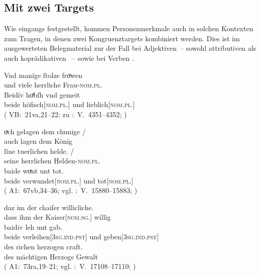 \subsection{Mit zwei Targets}
\label{subsec:beidkoordtarg}

Wie eingangs festgestellt, kommen Personenmerkmale auch in
solchen Kontexten zum Tragen, in denen zwei Kongruenztargets kombiniert werden.
Dies ist im ausgewerteten Belegmaterial zur \KC{} der Fall bei Adjektiven~--
sowohl attributiven  als auch
koprädikativen ~-- sowie bei
Verben .

\largerpage %
\begin{exe}
\ex \begin{xlist}
	\ex\label{ex:konjattradj}
		\gll Vnd maníge ſtolze froͮwen \\
			und viele herrliche Frau-\textsc{nom.pl.\FemF} \\%
	\sn \gll Beidív hoͤbſh vnd gemeit \\
			beide höfisch[\textsc{nom.pl.\FemF}] und lieblich[\textsc{nom.pl.\FemF}] \\
		\trans {} (%
				VB:~21va,21--22; zu
				\KC:~V.~4351--4352;
				\cite[161]{schroeder1895}%
			)

	\ex \label{ex:konjcopredadj}
		\gll oͮch gelagen dem chunige {/} \\
			auch lagen dem König \\
		\gll ſine tuerlichen helde. {/} \\
			seine herrlichen Helden-\textsc{nom.pl.\MascM} \\
		\gll baide woͮnt unt tot. \\
			beide verwundet[\textsc{nom.pl.\MascM}] und tot[\textsc{nom.pl.\MascM}] \\
		\trans {}
			(%
				A1:~67vb,34--36; vgl.
				\KC:~V.~15880--15883;
				\cite[368]{schroeder1895}%
			)

	\ex \label{ex:konjvb}
		\gll daz im der chaiſer willicliche. \\
			dass ihm der Kaiser[\textsc{nom.sg.\MascM}] willig \\
	\sn \gll baidiv leh unt gab. \\
			beide verleihen[\textsc{3sg\subM.ind.pst}] und
			geben[\textsc{3sg\subM.ind.pst}] \\
	\sn \gll des richen herzogen craft. \\
			des mächtigen Herzogs Gewalt \\
		\trans {}
			(%
				A1:~73ra,19--21; vgl.
				\KC:~V.~17108--17110;
				\cite[389]{schroeder1895}%
			)
	\end{xlist}
\end{exe}

